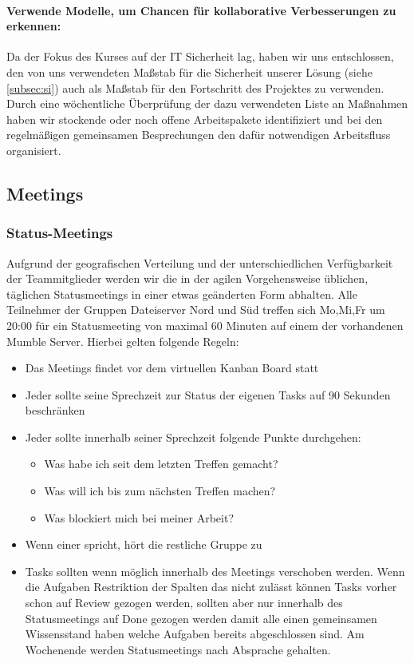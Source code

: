\paragraph{Verwende Modelle, um Chancen für kollaborative Verbesserungen zu erkennen:}
Da der Fokus des Kurses auf der IT Sicherheit lag, haben wir uns entschlossen, den von uns verwendeten Maßstab für die Sicherheit unserer Lösung (siehe  \ref{subsec:si}) auch als Maßstab für den Fortschritt des Projektes zu verwenden. \\

Durch eine wöchentliche Überprüfung der dazu verwendeten Liste an Maßnahmen haben wir stockende oder noch offene Arbeitspakete identifiziert und bei den regelmäßigen gemeinsamen Besprechungen den dafür notwendigen Arbeitsfluss organisiert.

\subsection{Meetings}
\subsubsection{Status-Meetings}
Aufgrund der geografischen Verteilung und der unterschiedlichen Verfügbarkeit der Teammitglieder werden wir die in der agilen Vorgehensweise üblichen, täglichen Statusmeetings in einer etwas geänderten Form abhalten. Alle Teilnehmer der Gruppen Dateiserver Nord und Süd treffen sich Mo,Mi,Fr um 20:00 für ein Statusmeeting von maximal 60 Minuten auf einem der vorhandenen Mumble Server. Hierbei gelten folgende Regeln:

\begin{itemize}
\item Das Meetings findet vor dem virtuellen Kanban Board statt
\item Jeder sollte seine Sprechzeit zur Status der eigenen Tasks auf 90 Sekunden beschränken
\item Jeder sollte innerhalb seiner Sprechzeit folgende Punkte durchgehen:
\begin{itemize}
\item Was habe ich seit dem letzten Treffen gemacht?
\item Was will ich bis zum nächsten Treffen machen?
\item Was blockiert mich bei meiner Arbeit?
\end{itemize}
\item Wenn einer spricht, hört die restliche Gruppe zu
\item Tasks sollten wenn möglich innerhalb des Meetings verschoben werden. Wenn die Aufgaben Restriktion der Spalten das nicht zulässt können Tasks vorher schon auf Review gezogen werden, sollten aber nur innerhalb des Statusmeetings auf Done gezogen werden damit alle einen gemeinsamen Wissensstand haben welche Aufgaben bereits abgeschlossen sind. Am Wochenende werden Statusmeetings nach Absprache gehalten.
\end{itemize}

